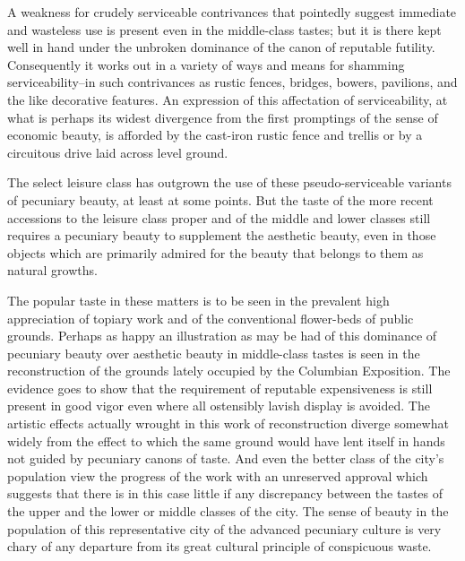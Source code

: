 \documentclass[12pt]{report}
\begin{document}
A weakness for crudely serviceable contrivances that pointedly suggest
immediate and wasteless use is present even in the middle-class tastes;
but it is there kept well in hand under the unbroken dominance of the
canon of reputable futility. Consequently it works out in a variety
of ways and means for shamming serviceability--in such contrivances
as rustic fences, bridges, bowers, pavilions, and the like decorative
features. An expression of this affectation of serviceability, at what
is perhaps its widest divergence from the first promptings of the
sense of economic beauty, is afforded by the cast-iron rustic fence and
trellis or by a circuitous drive laid across level ground.

The select leisure class has outgrown the use of these
pseudo-serviceable variants of pecuniary beauty, at least at some
points. But the taste of the more recent accessions to the leisure class
proper and of the middle and lower classes still requires a pecuniary
beauty to supplement the aesthetic beauty, even in those objects which
are primarily admired for the beauty that belongs to them as natural
growths.

The popular taste in these matters is to be seen in the prevalent high
appreciation of topiary work and of the conventional flower-beds of
public grounds. Perhaps as happy an illustration as may be had of this
dominance of pecuniary beauty over aesthetic beauty in middle-class
tastes is seen in the reconstruction of the grounds lately occupied by
the Columbian Exposition. The evidence goes to show that the requirement
of reputable expensiveness is still present in good vigor even where
all ostensibly lavish display is avoided. The artistic effects actually
wrought in this work of reconstruction diverge somewhat widely from
the effect to which the same ground would have lent itself in hands not
guided by pecuniary canons of taste. And even the better class of the
city's population view the progress of the work with an unreserved
approval which suggests that there is in this case little if any
discrepancy between the tastes of the upper and the lower or middle
classes of the city. The sense of beauty in the population of this
representative city of the advanced pecuniary culture is very chary of
any departure from its great cultural principle of conspicuous waste.
\end{document}
